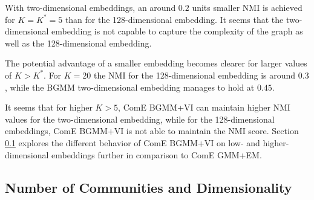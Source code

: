 \documentclass[conference]{IEEEtran}
\begin{document}
With two-dimensional embeddings, an around $0.2$ units smaller NMI is achieved for $K=K^*=5$ than for the 128-dimensional embedding. It seems that the two-dimensional embedding is not capable to capture the complexity of the graph as well as the 128-dimensional embedding.

The potential advantage of a smaller embedding becomes clearer for larger values of $K>K^*$. For $K=20$ the NMI for the 128-dimensional embedding is around $0.3$, while the BGMM two-dimensional embedding manages to hold at $0.45$.

It seems that for higher $K>5$, ComE BGMM+VI can maintain higher NMI values for the two-dimensional embedding, while for the 128-dimensional embeddings, ComE BGMM+VI is not able to maintain the NMI score. Section \ref{sec:eval_DBLP_result_k} explores the different behavior of ComE BGMM+VI on low- and higher-dimensional embeddings further in comparison to ComE GMM+EM.


\subsection{Number of Communities and Dimensionality}
\label{sec:eval_DBLP_result_k}
\end{document}
